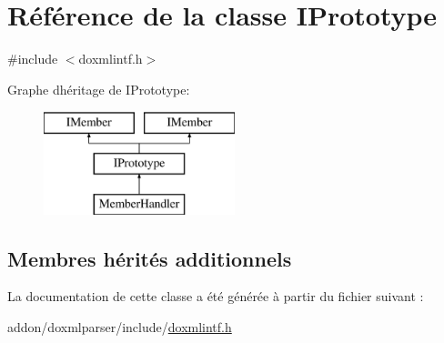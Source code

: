 \hypertarget{class_i_prototype}{}\section{Référence de la classe I\+Prototype}
\label{class_i_prototype}


{\ttfamily \#include $<$doxmlintf.\+h$>$}

Graphe d\textquotesingle{}héritage de I\+Prototype\+:\begin{figure}[H]
\begin{center}
\leavevmode
\includegraphics[height=3.000000cm]{class_i_prototype}
\end{center}
\end{figure}
\subsection*{Membres hérités additionnels}


La documentation de cette classe a été générée à partir du fichier suivant \+:\begin{DoxyCompactItemize}
\item 
addon/doxmlparser/include/\hyperlink{include_2doxmlintf_8h}{doxmlintf.\+h}\end{DoxyCompactItemize}

